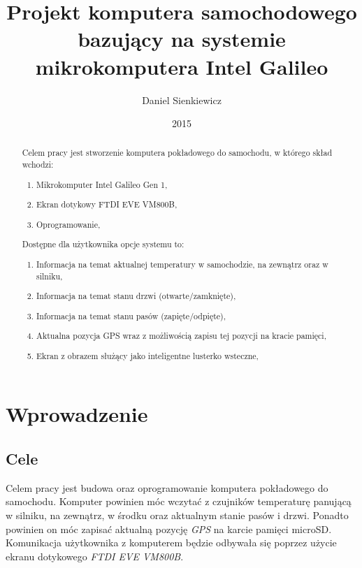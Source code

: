 \documentclass{xmgr}
\author   {Daniel Sienkiewicz}
\title    {Projekt komputera samochodowego bazujący na systemie mikrokomputera Intel Galileo}
\date     {2015}
\begin{document}
\begin{abstract}
Celem pracy jest stworzenie komputera pokładowego do samochodu, w którego skład wchodzi: 
\begin{enumerate}
\item Mikrokomputer Intel Galileo Gen 1, 
\item Ekran dotykowy FTDI EVE VM800B, 
\item Oprogramowanie,
\end{enumerate}

Dostępne dla użytkownika opcje systemu to:
\begin{enumerate}
\item Informacja na temat aktualnej temperatury w samochodzie, na zewnątrz oraz w silniku,
\item Informacja na temat stanu drzwi (otwarte/zamknięte), 
\item Informacja na temat stanu pasów (zapięte/odpięte), 
\item Aktualna pozycja GPS wraz z możliwością zapisu tej pozycji na kracie pamięci, 
\item Ekran z obrazem służący jako inteligentne lusterko wsteczne,
\end{enumerate}

\end{abstract}
\maketitle

\chapter{Wprowadzenie}
\section{Cele}
Celem pracy jest budowa oraz oprogramowanie komputera pokładowego do samochodu. Komputer powinien móc wczytać z czujników temperaturę panującą w silniku, na zewnątrz, w środku oraz aktualnym stanie pasów i drzwi. Ponadto powinien on móc zapisać aktualną pozycję \emph{GPS} na karcie pamięci microSD. Komunikacja użytkownika z komputerem będzie odbywała się poprzez użycie ekranu dotykowego \emph{FTDI EVE VM800B}.
\end{document}
